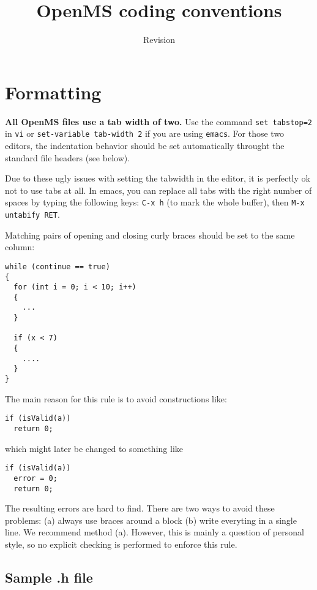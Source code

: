 \documentclass[a4]{article}
\title{OpenMS coding conventions}
\author{}
\date{$ $Revision$ $}
\begin{document}
\maketitle

\section{Formatting}

{\bf All OpenMS files use a tab width of two.} Use the command {\tt set tabstop=2} in
{\tt vi} or {\tt set-variable tab-width 2} if you are using {\tt emacs}. For
those two editors, the indentation behavior should be set automatically
throught the standard file headers (see below).

Due to these ugly issues with setting the tabwidth in the editor, it is
perfectly ok not to use tabs at all.  In emacs, you can replace all tabs with
the right number of spaces by typing the following keys: \texttt{C-x h} (to
mark the whole buffer), then \texttt{M-x untabify RET}.

Matching pairs of opening and closing curly braces should be set to the same
column:
\begin{verbatim}
while (continue == true)
{
  for (int i = 0; i < 10; i++)
  {
    ...
  }

  if (x < 7)
  {
    ....
  }
}
\end{verbatim}
The main reason for this rule is to avoid constructions like:

\begin{verbatim}
if (isValid(a))
  return 0;
\end{verbatim}

which might later be changed to something like

\begin{verbatim}
if (isValid(a))
  error = 0;
  return 0;
\end{verbatim}

The resulting errors are hard to find. There are two ways to avoid these
problems: (a) always use braces around a block (b) write everyting in a single
line. We recommend method (a).
However, this is mainly a question of personal style, so no explicit checking
is performed to enforce this rule.

\subsection{Sample .h file}
\end{document}
